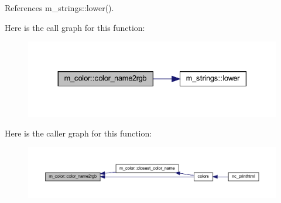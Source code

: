 References m\+\_\+strings\+::lower().

Here is the call graph for this function\+:
\nopagebreak
\begin{figure}[H]
\begin{center}
\leavevmode
\includegraphics[width=330pt]{namespacem__color_a84a36043d278bc56a7148483a862dec8_cgraph}
\end{center}
\end{figure}
Here is the caller graph for this function\+:
\nopagebreak
\begin{figure}[H]
\begin{center}
\leavevmode
\includegraphics[width=350pt]{namespacem__color_a84a36043d278bc56a7148483a862dec8_icgraph}
\end{center}
\end{figure}
\mbox{\label{namespacem__color_a40e6c91da216384eded2157cdaf86eba}} 
